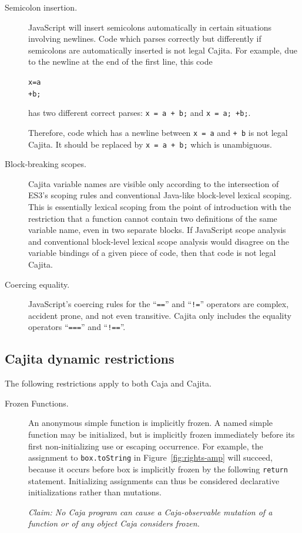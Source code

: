 \documentclass[letterpaper,twocolumn,10pt]{article}
\newcommand{\code}[1]{{\tt {#1}}}              %
\begin{document}
\begin{description}
    \item[Semicolon insertion.] JavaScript will insert semicolons automatically in certain situations involving
    newlines. Code which parses correctly but differently if semicolons are automatically inserted is not legal Cajita.  
    For example, due to the newline at the end of the first line, this code
\begin{alltt}
x = a 
      + b;
\end{alltt}
    has two different correct parses: \code{x = a + b;} and \code{x = a; +b;}.  
    
    Therefore, code which has a newline between \code{x = a} and \code{+ b} is not legal Cajita.  
    It should be replaced by \code{x = a + b;} which is unambiguous.
    
    \item[Block-breaking scopes.] Cajita variable names are visible only according to the intersection of ES3's 
    scoping rules and conventional Java-like block-level lexical scoping. This is essentially lexical scoping from 
    the point of introduction with the restriction that a function cannot contain two definitions of the same 
    variable name, even in two separate blocks. If JavaScript scope analysis and conventional block-level lexical 
    scope analysis would disagree on the variable bindings of a given piece of code, then that code is not legal 
    Cajita.
    
    \item[Coercing equality.] JavaScript's coercing rules for the ``\code{==}'' and ``\code{!=}'' operators are 
    complex, accident prone, and not even transitive. Cajita only includes the equality operators ``\code{===}'' and 
    ``\code{!==}''.
        
\end{description}


\subsection{Cajita dynamic restrictions}
\label{subsec:cajita:dynamic}

The following restrictions apply to both Caja and Cajita.

\begin{description}

  \item[Frozen Functions.] An anonymous simple function is implicitly frozen. 
  A named simple function may be initialized, but is implicitly frozen 
  immediately before its first non-initializing use or escaping occurrence. 
  For example, the assignment to \code{box.toString} in 
  Figure~\ref{fig:rights-amp} will succeed, because it occurs before box is 
  implicitly frozen by the following \code{return} statement. Initializing 
  assignments can thus be considered declarative initializations rather than 
  mutations.
  
  \emph{Claim: No Caja program can cause a Caja-observable mutation of a 
  function or of any object Caja considers frozen.}
  
\end{description}
\end{document}
